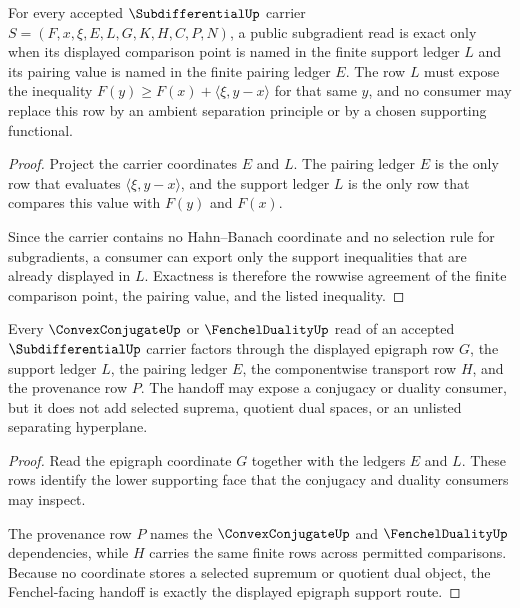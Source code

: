 \begin{theorem}
\label{thm:subdifferential-support-inequality-exactness}
For every accepted $\SubdifferentialUp$ carrier $S=(F,x,\xi,E,L,G,K,H,C,P,N)$, a public subgradient read is exact only when its displayed comparison point is named in the finite support ledger $L$ and its pairing value is named in the finite pairing ledger $E$. The row $L$ must expose the inequality $F(y)\geq F(x)+\langle \xi,y-x\rangle$ for that same $y$, and no consumer may replace this row by an ambient separation principle or by a chosen supporting functional.
\end{theorem}
\begin{proof}
Project the carrier coordinates $E$ and $L$. The pairing ledger $E$ is the only row that evaluates $\langle \xi,y-x\rangle$, and the support ledger $L$ is the only row that compares this value with $F(y)$ and $F(x)$.

Since the carrier contains no Hahn--Banach coordinate and no selection rule for subgradients, a consumer can export only the support inequalities that are already displayed in $L$. Exactness is therefore the rowwise agreement of the finite comparison point, the pairing value, and the listed inequality.
\end{proof}

\begin{theorem}
\label{thm:subdifferential-epigraph-fenchel-handoff}
Every $\ConvexConjugateUp$ or $\FenchelDualityUp$ read of an accepted $\SubdifferentialUp$ carrier factors through the displayed epigraph row $G$, the support ledger $L$, the pairing ledger $E$, the componentwise transport row $H$, and the provenance row $P$. The handoff may expose a conjugacy or duality consumer, but it does not add selected suprema, quotient dual spaces, or an unlisted separating hyperplane.
\end{theorem}
\begin{proof}
Read the epigraph coordinate $G$ together with the ledgers $E$ and $L$. These rows identify the lower supporting face that the conjugacy and duality consumers may inspect.

The provenance row $P$ names the $\ConvexConjugateUp$ and $\FenchelDualityUp$ dependencies, while $H$ carries the same finite rows across permitted comparisons. Because no coordinate stores a selected supremum or quotient dual object, the Fenchel-facing handoff is exactly the displayed epigraph support route.
\end{proof}

